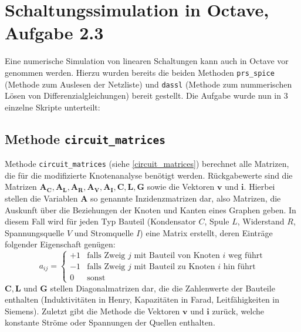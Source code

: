 \section*{Schaltungssimulation in Octave, Aufgabe 2.3}\label{sec:ag2.3}
Eine numerische Simulation von linearen Schaltungen kann auch in Octave vor genommen werden. Hierzu wurden bereits die beiden Methoden \texttt{prs\_spice} (Methode zum Auslesen der Netzliste) und \texttt{dassl} (Methode zum nummerischen Lösen von Differenzialgleichungen) bereit gestellt.
Die Aufgabe wurde nun in 3 einzelne Skripte unterteilt:

\subsection*{Methode \texttt{circuit\_matrices}}
	Methode \texttt{circuit\_matrices} (siehe \ref{circuit_matrices}) berechnet alle Matrizen, die für die modifizierte Knotenanalyse benötigt werden. Rückgabewerte sind die Matrizen $\mathbf{A_C, A_L, A_R, A_V, A_I, C, L, G}$ sowie die Vektoren $\mathbf{v}$ und $\mathbf{i}$. Hierbei stellen die Variablen $\mathbf{A}$ so genannte Inzidenzmatrizen dar, also Matrizen, die Auskunft über die Beziehungen der Knoten und Kanten eines Graphen geben. In diesem Fall wird für jeden Typ Bauteil (Kondensator $C$, Spule $L$, Widerstand $R$, Spannungsquelle $V$ und Stromquelle $I$) eine Matrix erstellt, deren Einträge folgender Eigenschaft genügen:
	\begin{equation}
	a_{ij} = \begin{cases}
	+1 & \text{falls Zweig }j \text{ mit Bauteil von Knoten }i \text{ weg führt} \\
	-1 & \text{falls Zweig }j \text{ mit Bauteil zu Knoten }i \text{ hin führt} \\
	0  & \text{sonst}
	\end{cases}
	\end{equation}
	$\mathbf{C, L}$ und $\mathbf{G}$ stellen Diagonalmatrizen dar, die die Zahlenwerte der Bauteile enthalten (Induktivitäten in
	Henry, Kapazitäten in Farad, Leitfähigkeiten in Siemens). Zuletzt gibt die Methode die Vektoren $\mathbf{v}$ und $\mathbf{i}$ zurück, welche konstante Ströme oder Spannungen der Quellen enthalten.
	
